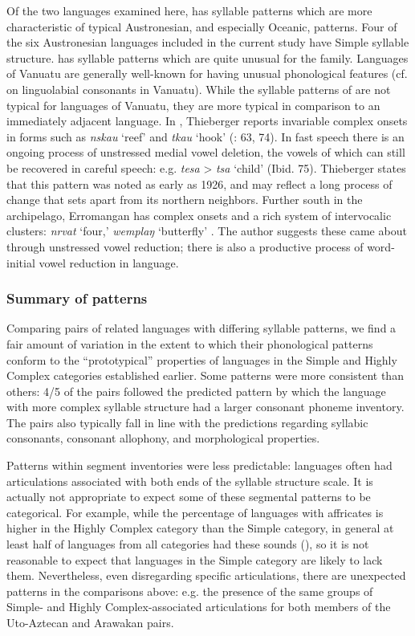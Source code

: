   Of the two languages examined here,  has syllable patterns which are more characteristic of typical Austronesian, and especially Oceanic, patterns. Four of the six Austronesian languages included in the current study have Simple syllable structure.  has syllable patterns which are quite unusual for the family. Languages of Vanuatu are generally well-known for having unusual phonological features (cf. \citealt{Maddieson1989b} on linguolabial consonants in Vanuatu). While the syllable patterns of  are not typical for languages of Vanuatu, they are more typical in comparison to an immediately adjacent language. In , Thieberger reports invariable complex onsets in forms such as \textit{nskau} ‘reef’ and \textit{tkau} ‘hook’ (\citealt{Thieberger2004}: 63, 74). In fast speech there is an ongoing process of unstressed medial vowel deletion, the vowels of which can still be recovered in careful speech: e.g. \textit{tesa} > \textit{tsa} ‘child’ (Ibid. 75). Thieberger states that this pattern was noted as early as 1926, and may reflect a long process of change that sets  apart from its northern neighbors. Further south in the archipelago, Erromangan has complex onsets and a rich system of intervocalic clusters: \textit{nrvat} ‘four,’ \textit{wemplaŋ} ‘butterfly’ \citep[20-2]{Crowley1998}. The author suggests these came about through unstressed vowel reduction; there is also a productive process of word-initial vowel reduction in language.

\subsubsection{{Summary} {of} {patterns}}\label{sec:8.4.3.7}

  Comparing pairs of related languages with differing syllable patterns, we find a fair amount of variation in the extent to which their phonological patterns conform to the ``prototypical'' properties of languages in the Simple and Highly Complex categories established earlier. Some patterns were more consistent than others: 4/5 of the pairs followed the predicted pattern by which the language with more complex syllable structure had a larger consonant phoneme inventory. The pairs also typically fall in line with the predictions regarding syllabic consonants, consonant allophony, and morphological properties.

  Patterns within segment inventories were less predictable: languages often had articulations associated with both ends of the syllable structure scale. It is actually not appropriate to expect some of these segmental patterns to be categorical. For example, while the percentage of languages with affricates is higher in the Highly Complex category than the Simple category, in general at least half of languages from all categories had these sounds (), so it is not reasonable to expect that languages in the Simple category are likely to lack them. Nevertheless, even disregarding specific articulations, there are unexpected patterns in the comparisons above: e.g. the presence of the same groups of Simple- and Highly Complex-associated articulations for both members of the Uto-Aztecan and Arawakan pairs.

